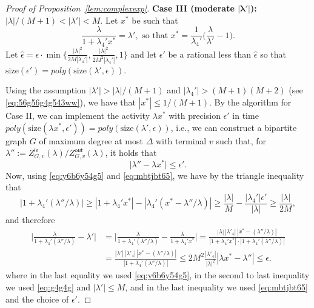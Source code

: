 \documentclass[11pt]{article}
\def\Zin{Z^{\mathsf{in}}}
\def\Zout{Z^{\mathsf{out}}}
\newcommand{\size}[1]{\mathrm{size}(#1)}
\begin{document}
\begin{proof}[Proof of Proposition~\ref{lem:complexexp}]
\vskip 0.2cm

\noindent \textbf{Case III (moderate $\mathbf{|\lambda'|}$): $|\lambda|/(M+1)<|\lambda'|<M$}. Let $x^*$ be such that 
\begin{equation}\label{eq:y6b6y54g5}
\frac{\lambda}{1+\lambda_4'  x^*}=\lambda',\mbox{ so that }x^*=\frac{1}{\lambda_4'}\Big(\frac{\lambda}{\lambda'}-1\Big).
\end{equation}
Let $\hat{\epsilon}=\epsilon\cdot \min\{\frac{|\lambda|^2}{2M|\lambda_4'|},\frac{|\lambda|^2}{2M^2|\lambda_4'|},1\}$ and let $\epsilon'$ be a rational less than $\hat{\epsilon}$ so that $\size{\epsilon'}=poly(\size{\lambda',\epsilon})$.  



Using the assumption $|\lambda'|>|\lambda|/(M+1)$ and  $|\lambda_4'|> (M+1)(M+2)$ (see \eqref{eq:56g56g4g543ww}), we have that $|x^*|\leq 1/(M+1)$.  By the algorithm for Case II, we can implement the activity $\lambda x^*$ with precision $\epsilon'$ in time $poly(\size{\lambda x^*, \epsilon'})=poly(\size{\lambda', \epsilon})$, i.e., we can construct a bipartite graph $G$ of maximum degree at most $\Delta$ with terminal $v$ such that, for  $\lambda'':=\Zin_{G,v}(\lambda)/\Zout_{G,v}(\lambda)$, it holds that
\begin{equation}\label{eq:mbtjbt65}
\big|\lambda''- \lambda x^*\big|  \leq \epsilon'.
\end{equation}
Now, using \eqref{eq:y6b6y54g5} and \eqref{eq:mbtjbt65}, we have by the triangle inequality that
\begin{equation}\label{eq:g4g4g}
|1+ \lambda_4'(\lambda''/\lambda)|\geq |1+ \lambda_4' x^*|-|\lambda_4' (x^*-\lambda''/\lambda)|\geq \frac{|\lambda|}{M}- \frac{|\lambda_4'|\epsilon'}{|\lambda|}\geq \frac{|\lambda|}{2M},
\end{equation}
and therefore
\begin{equation}\label{eq:v4v4v35g3f2f}
\begin{aligned}
\Big|\frac{\lambda}{1+ \lambda_4'(\lambda''/\lambda)}-\lambda'\Big|&=\Big|\frac{\lambda}{1+ \lambda_4'(\lambda''/\lambda)}-\frac{\lambda}{1+ \lambda_4'x^*}\Big|=\frac{|\lambda|\, |\lambda'_4|\, |x^*-(\lambda''/\lambda)|}{|1+ \lambda_4'x^*|\cdot |1+ \lambda_4'(\lambda''/\lambda)|}\\
&= \frac{|\lambda'|\, |\lambda'_4|\, |x^*-(\lambda''/\lambda)|}{|1+ \lambda_4'(\lambda''/\lambda)|}\leq 2M^2 \frac{|\lambda'_4|}{|\lambda|^2} |\lambda x^*-\lambda''|\leq \epsilon.
\end{aligned}
\end{equation}
where in the last equality we used \eqref{eq:y6b6y54g5}, in the second to last inequality we used \eqref{eq:g4g4g} and $|\lambda'|\leq M$, and in the last inequality we used \eqref{eq:mbtjbt65} and the choice of $\epsilon'$.



\end{proof}
\end{document}
